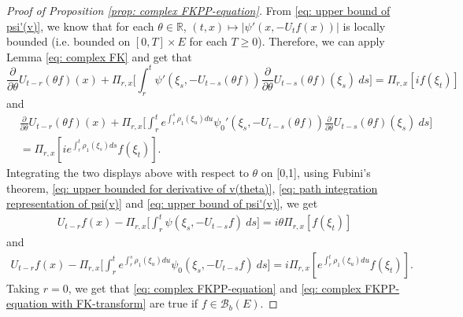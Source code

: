 \documentclass[12pt,a4paper]{amsart}
\theoremstyle{plain}
\theoremstyle{definition}
\numberwithin{equation}{section}
\begin{document}
\begin{proof}[Proof of Proposition \ref{prop: complex FKPP-equation}]
  From \eqref{eq: upper bound of psi'(v)}, we know that for each $\theta\in \mathbb R$, $(t,x) \mapsto |\psi'(x,-U_tf(x))|$ is locally bounded (i.e. bounded on $[0,T]\times E$ for each $T \geq 0$).
  Therefore, we can apply Lemma \ref{eq: complex FK} and get that
  \[
    \frac{\partial}{\partial \theta} U_{t-r}(\theta f)(x) + \Pi_{r,x} \Big[\int_r^t \psi' (\xi_s,- U_{t-s}(\theta f) )\frac{\partial}{\partial \theta} U_{t-s}(\theta f)(\xi_s)~ds\Big]
    = \Pi_{r,x} [i f(\xi_t)]
  \]
  and
  \begin{align}
    & \frac{\partial}{\partial \theta} U_{t-r}(\theta f)(x) + \Pi_{r,x} \Big[\int_r^t e^{\int_r^s \rho_1(\xi_u)du}\psi_0' (\xi_s,- U_{t-s}(\theta f) )\frac{\partial}{\partial \theta} U_{t-s}(\theta f)(\xi_s)~ds\Big]\\
    & = \Pi_{r,x} [i e^{\int_r^t \rho_1(\xi_s)ds}f(\xi_t)].
  \end{align}
  Integrating the two displays above with respect to $\theta$  on [0,1], using
  Fubini's theorem, \eqref{eq: upper bounded for derivative of v(theta)}, \eqref{eq: path integration representation of psi(v)} and \eqref{eq: upper bound of psi'(v)}, we get
  \begin{align}
    U_{t-r}f(x) - \Pi_{r,x} \Big[\int_r^t \psi (\xi_s,-U_{t-s}f ) ~ds\Big]
    = i \theta \Pi_{r,x} [f(\xi_t)]
  \end{align}
  and
  \begin{align}
    U_{t-r}f(x) - \Pi_{r,x} \Big[\int_r^t e^{\int_r^s \rho_1(\xi_u)du} \psi_0 (\xi_s,- U_{t-s}f ) ~ds\Big]
    = i \Pi_{r,x} [e^{\int_r^t\rho_1(\xi_u)du}f(\xi_t)].
  \end{align}
  Taking $r = 0$, we get that \eqref{eq: complex FKPP-equation} and \eqref{eq: complex FKPP-equation with FK-transform} are true if $f\in \mathcal B_b(E)$.


\end{proof}
\end{document}
